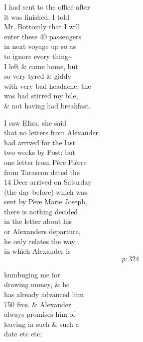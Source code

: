 \documentclass{report}
\begin{document}



	\par{
 	I had sent to the office after\ \\it was finished; I told\ \\Mr. Bottomly that I will\ \\enter these 40 passengers\ \\in next voyage up so as\ \\to ignore every thing\~{}\ \\I left \& came home, but\ \\so very tyred \& giddy\ \\with very bad headache, the\ \\was had stirred my bile,\ \\\& not having had breakfast,\ \\
	}

	\par{
 	I saw Eliza, she said\ \\that no letters from Alexander\ \\had arrived for the last\ \\two weeks by Post; but\ \\one letter from Père Pièrre\ \\from Tarascon dated the\ \\14 Decr arrived on Saturday\ \\(the day before) which was\ \\sent by Père Marie Joseph,\ \\there is nothing decided\ \\in the letter about his\ \\or Alexanders departure,\ \\he only relates the way\ \\in which Alexander is\ \\
  \[p: 324 \]

	}

	\par{
 	humbuging me for\ \\drawing money, \& he\ \\has already advanced him\ \\750 frcs, \& Alexander\ \\always promises hîm of\ \\leaving in such \& such a\ \\date etc etc;\ \\
	}
\end{document}

